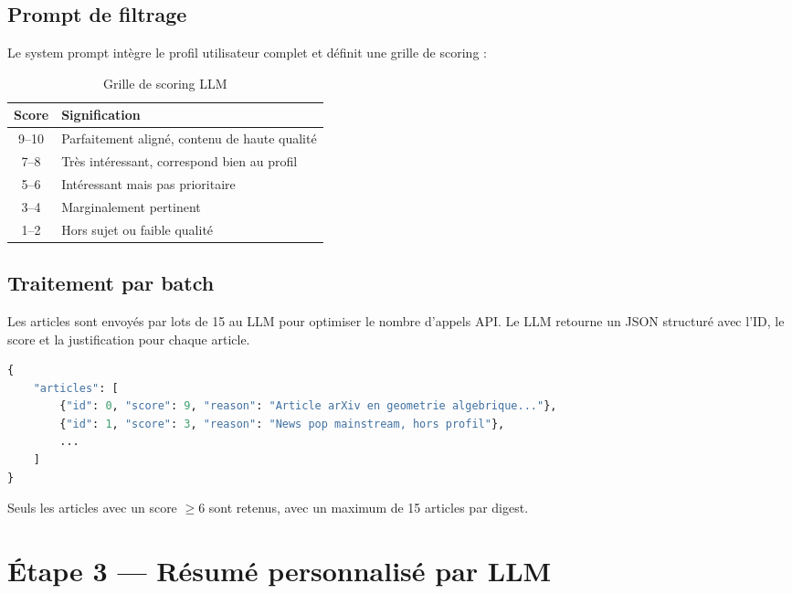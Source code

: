 \documentclass[11pt, a4paper]{article}
\begin{document}
\subsection{Prompt de filtrage}

Le system prompt intègre le profil utilisateur complet et définit une grille de scoring :

\begin{table}[h]
\centering
\begin{tabular}{cl}
\toprule
\textbf{Score} & \textbf{Signification} \\
\midrule
9--10 & Parfaitement aligné, contenu de haute qualité \\
7--8 & Très intéressant, correspond bien au profil \\
5--6 & Intéressant mais pas prioritaire \\
3--4 & Marginalement pertinent \\
1--2 & Hors sujet ou faible qualité \\
\bottomrule
\end{tabular}
\caption{Grille de scoring LLM}
\end{table}

\subsection{Traitement par batch}

Les articles sont envoyés par lots de 15 au LLM pour optimiser le nombre d'appels API. Le LLM retourne un JSON structuré avec l'ID, le score et la justification pour chaque article.

\begin{lstlisting}[language=Python, caption={Format de réponse attendu du LLM}]
{
    "articles": [
        {"id": 0, "score": 9, "reason": "Article arXiv en geometrie algebrique..."},
        {"id": 1, "score": 3, "reason": "News pop mainstream, hors profil"},
        ...
    ]
}
\end{lstlisting}

Seuls les articles avec un score $\geq 6$ sont retenus, avec un maximum de 15 articles par digest.

\section{Étape 3 --- Résumé personnalisé par LLM}
\end{document}
